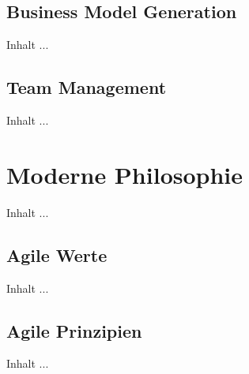 \subsection{Business Model Generation}
Inhalt ...

\subsection{Team Management}
Inhalt ...



\section{Moderne Philosophie}
Inhalt ...

\subsection{Agile Werte}
Inhalt ...

\subsection{Agile Prinzipien}
Inhalt ...
